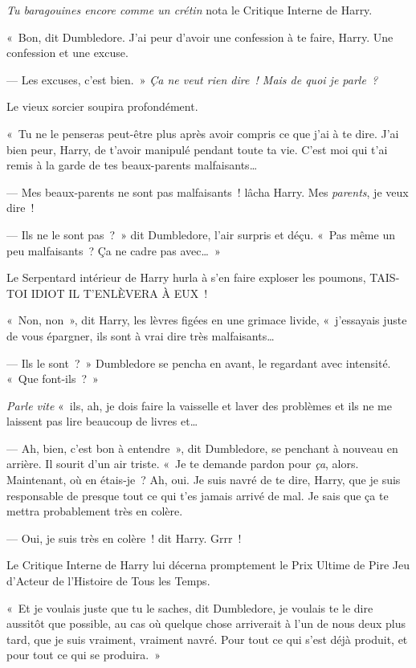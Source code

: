 \emph{Tu baragouines encore comme un crétin} nota le Critique Interne de Harry.

«~Bon, dit Dumbledore. J'ai peur d'avoir une confession à te faire, Harry. Une confession et une excuse.

--- Les excuses, c'est bien.~» \emph{Ça ne veut rien dire~! Mais de quoi je parle~?}

Le vieux sorcier soupira profondément.

«~Tu ne le penseras peut-être plus après avoir compris ce que j'ai à te dire. J'ai bien peur, Harry, de t'avoir manipulé pendant toute ta vie. C'est moi qui t'ai remis à la garde de tes beaux-parents malfaisants…

--- Mes beaux-parents ne sont pas malfaisants~! lâcha Harry. Mes \emph{parents}, je veux dire~!

--- Ils ne le sont pas~?~» dit Dumbledore, l'air surpris et déçu. «~Pas même un peu malfaisants~? Ça ne cadre pas avec…~»

Le Serpentard intérieur de Harry hurla à s'en faire exploser les poumons, TAIS-TOI IDIOT IL T'ENLÈVERA À EUX~!

«~Non, non~», dit Harry, les lèvres figées en une grimace livide, «~j'essayais juste de vous épargner, ils sont à vrai dire très malfaisants…

--- Ils le sont~?~» Dumbledore se pencha en avant, le regardant avec intensité. «~Que font-ils~?~»

\emph{Parle vite} «~ils, ah, je dois faire la vaisselle et laver des problèmes et ils ne me laissent pas lire beaucoup de livres et…

--- Ah, bien, c'est bon à entendre~», dit Dumbledore, se penchant à nouveau en arrière. Il sourit d'un air triste. «~Je te demande pardon pour \emph{ça}, alors. Maintenant, où en étais-je~? Ah, oui. Je suis navré de te dire, Harry, que je suis responsable de presque tout ce qui t'es jamais arrivé de mal. Je sais que ça te mettra probablement très en colère.

--- Oui, je suis très en colère~! dit Harry. Grrr~!

Le Critique Interne de Harry lui décerna promptement le Prix Ultime de Pire Jeu d'Acteur de l'Histoire de Tous les Temps.

«~Et je voulais juste que tu le saches, dit Dumbledore, je voulais te le dire aussitôt que possible, au cas où quelque chose arriverait à l'un de nous deux plus tard, que je suis vraiment, vraiment navré. Pour tout ce qui s'est déjà produit, et pour tout ce qui se produira.~»

